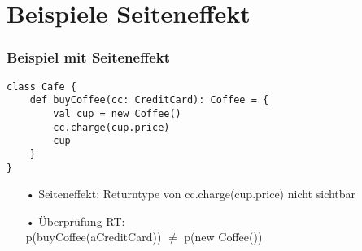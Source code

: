 	\section[Section]{Beispiele Seiteneffekt}
		\begin{frame}[fragile]
		\frametitle{Beispiel mit Seiteneffekt}
		\begin{lstlisting}[style=myScalastyle]
class Cafe {
	def buyCoffee(cc: CreditCard): Coffee = {
		val cup = new Coffee()
		cc.charge(cup.price)
		cup
	}
}
\end{lstlisting}
\begin{itemize}
				\item[•] Seiteneffekt: Returntype von cc.charge(cup.price) nicht sichtbar
				\item[•] Überprüfung RT: \\ p(buyCoffee(aCreditCard)) $\neq$ p(new Coffee())
				\end{itemize}

\end{frame}
		
			